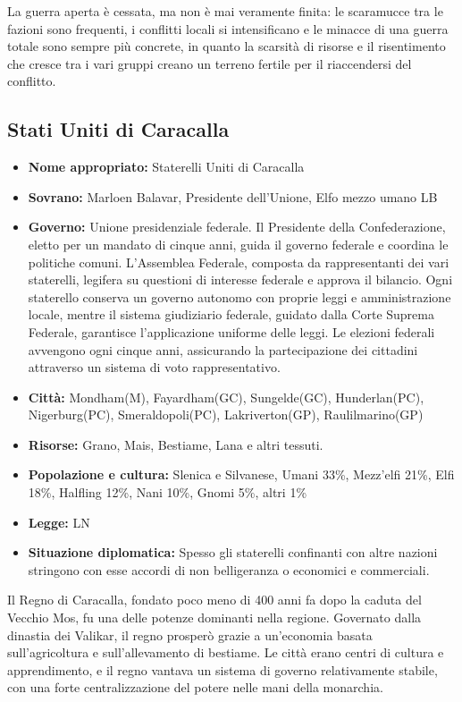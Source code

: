 \documentclass[10pt, a4paper]{report}
\begin{document}
\begin{multicols}{2}
La guerra aperta è cessata, ma non è mai veramente finita: le scaramucce tra le fazioni sono frequenti, i conflitti locali si intensificano e le minacce di una guerra totale sono sempre più concrete, in quanto la scarsità di risorse e il risentimento che cresce tra i vari gruppi creano un terreno fertile per il riaccendersi del conflitto.

\subsection*{Stati Uniti di Caracalla}
\begin{itemize}
	\item \textbf{Nome appropriato:} Staterelli Uniti di Caracalla
	\item \textbf{Sovrano:} Marloen Balavar, Presidente dell'Unione, Elfo mezzo umano LB
	\item \textbf{Governo:} Unione presidenziale federale. Il Presidente della Confederazione, eletto per un mandato di cinque anni, guida il governo federale e coordina le politiche comuni. L'Assemblea Federale, composta da rappresentanti dei vari staterelli, legifera su questioni di interesse federale e approva il bilancio. Ogni staterello conserva un governo autonomo con proprie leggi e amministrazione locale, mentre il sistema giudiziario federale, guidato dalla Corte Suprema Federale, garantisce l’applicazione uniforme delle leggi. Le elezioni federali avvengono ogni cinque anni, assicurando la partecipazione dei cittadini attraverso un sistema di voto rappresentativo.
	\item \textbf{Città:} Mondham(M), Fayardham(GC), Sungelde(GC), Hunderlan(PC), Nigerburg(PC), Smeraldopoli(PC), Lakriverton(GP), Raulilmarino(GP)
	\item \textbf{Risorse:} Grano, Mais, Bestiame, Lana e altri tessuti.
	\item \textbf{Popolazione e cultura:} Slenica e Silvanese, Umani 33\%, Mezz'elfi 21\%, Elfi 18\%, Halfling 12\%, Nani 10\%, Gnomi 5\%, altri 1\%
	\item \textbf{Legge:} LN
	\item \textbf{Situazione diplomatica:} Spesso gli staterelli confinanti con altre nazioni stringono con esse accordi di non belligeranza o economici e commerciali.
\end{itemize}
Il Regno di Caracalla, fondato poco meno di 400 anni fa dopo la caduta del Vecchio Mos, fu una delle potenze dominanti nella regione. Governato dalla dinastia dei Valikar, il regno prosperò grazie a un'economia basata sull'agricoltura e sull'allevamento di bestiame. Le città erano centri di cultura e apprendimento, e il regno vantava un sistema di governo relativamente stabile, con una forte centralizzazione del potere nelle mani della monarchia.

\end{multicols}
\end{document}
